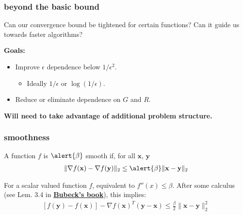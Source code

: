 \documentclass[compress]{beamer}
\newcommand{\bv}[1]{\mathbf{#1}}
\begin{document}
\begin{frame}
	\frametitle{beyond the basic bound}
	Can our convergence bound be tightened for certain functions? Can it guide us towards faster algorithms?
	
	\textbf{Goals:}
	\begin{itemize}
		\item Improve $\epsilon$ dependence below $1/\epsilon^2$.
		\begin{itemize}
			\item Ideally $1/\epsilon$ or $\log(1/\epsilon)$. 
		\end{itemize}
		\item Reduce or eliminate dependence on $G$ and $R$.
	\end{itemize}
	\alert{\textbf{Will need to take advantage of additional problem structure.}}
\end{frame}

\begin{frame}[t]
	\frametitle{smoothness}
	\begin{definition}
		A function $f$ is $\alert{\beta}$ smooth if, for all $\bv{x}$, $\bv{y}$
		\begin{align*}
			\|\nabla f(\bv{x}) - \nabla f(\bv{y})\|_2 \leq \alert{\beta} \|\bv{x} - \bv{y}\|_2
		\end{align*}
	\end{definition}
	For a scalar valued function $f$, equivalent to $f''(x) \leq \beta$. 
	\vspace{4em}
	After some calculus (see Lem. 3.4 in \color{blue}\textbf{\href{https://arxiv.org/pdf/1405.4980.pdf}{Bubeck's book}}\color{black}), this implies:
	\begin{align*}
		\left[f(\bv{y}) - f(\bv{x})\right] - \nabla f(\bv{x})^T(\bv{y} - \bv{x})  \leq \frac{\beta}{2}\|\bv{x} - \bv{y}\|_2^2
	\end{align*}
\end{frame}
\end{document}
